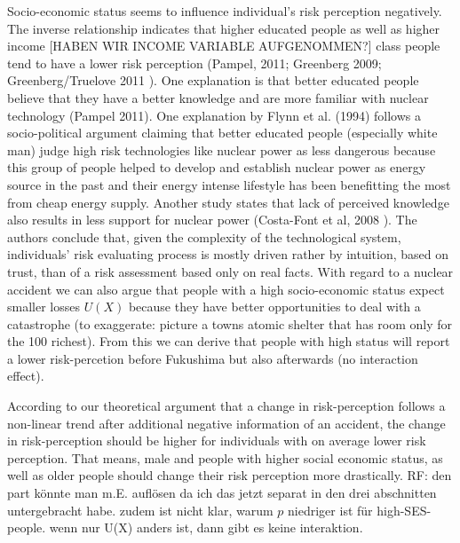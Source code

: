 Socio-economic status seems to influence individual's risk perception negatively. The inverse relationship indicates that higher educated people as well as higher income [HABEN WIR INCOME VARIABLE AUFGENOMMEN?] class people tend to have a lower risk perception (Pampel, 2011; Greenberg 2009; Greenberg/Truelove 2011 \citep{Pampel:2011cx,Greenberg:2009fx,Greenberg:2011ja}).  One explanation is that better educated people believe that they have a better knowledge and are more familiar with nuclear technology (Pampel 2011). One explanation by Flynn et al. (1994) \citep{Flynn:1994dn} follows a socio-political argument claiming that better educated people    (especially white man) judge high risk technologies like nuclear power as less dangerous because this group of people helped to develop and establish nuclear power as energy source in the past and their energy intense lifestyle has been benefitting the most from cheap energy supply. Another study states that lack of perceived knowledge also results in less support for nuclear power  (Costa-Font et al, 2008 \citep{CostaFont:2008hf}).  The authors conclude that, given the complexity of the technological system, individuals' risk evaluating process is mostly driven rather by intuition, based on trust, than of a risk assessment based only on real facts. With regard to a nuclear accident we can also argue that people with a high socio-economic status expect smaller losses $U(X)$ because they have better opportunities to deal with a catastrophe (to exaggerate: picture a towns atomic shelter that has room only for the 100 richest). From this we can derive that people with high status will report a lower risk-percetion before Fukushima but also afterwards (no interaction effect).

According to our theoretical argument that a change in risk-perception follows a non-linear trend after additional negative information of an accident, the change in risk-perception should be higher for individuals with on average lower risk perception.  That means, male and people with higher social economic status, as well as older people should change their risk perception more drastically. 
RF: den part könnte man m.E. auflösen da ich das jetzt separat in den drei abschnitten untergebracht habe. zudem ist nicht klar, warum $p$ niedriger ist für high-SES-people. wenn nur U(X) anders ist, dann gibt es keine interaktion.
 
